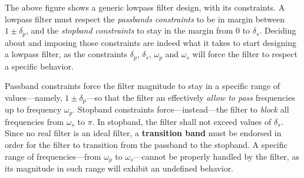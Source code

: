 \documentclass[\documentfontsize, twocolumn]{\classname}
\begin{document}
\begin{center}
\end{center}

The above figure shows a generic lowpass filter design, with its constraints. A lowpass filter must respect the \emph{passbands constraints} to be in margin between $1 \pm \delta_p$, and the \emph{stopband constraints} to stay in the margin from $0$ to $\delta_s$. Deciding about and imposing those constraints are indeed what it takes to start designing a lowpass filter, as the constraints $\delta_p$, $\delta_s$, $\omega_p$ and $\omega_s$ will force the filter to respect a specific behavior.

Passband constraints force the filter magnitude to stay in a specific range of values---namely, $1 \pm \delta_p$---so that the filter an effectively \emph{allow to pass} frequencies up to frequency $\omega_p$. Stopband constraints force---instead---the filter to \emph{block} all frequencies from $\omega_s$ to $\pi$. In stopband, the filter shall not exceed values of $\delta_s$. Since no real filter is an ideal filter, a \textbf{transition band} must be endorsed in order for the filter to transition from the passband to the stopband. A specific range of frequencies---from $\omega_p$ to $\omega_s$---cannot be properly handled by the filter, as its magnitude in such range will exhibit an undefined behavior.
\end{document}
